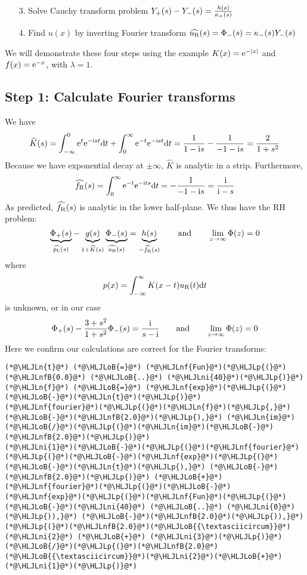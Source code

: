 \documentclass[12pt,landscape]{article}
\newcommand{\HLJLn}[1]{#1}
\newcommand{\HLJLnf}[1]{\textcolor[RGB]{66,102,213}{#1}}
\newcommand{\HLJLnfB}[1]{\textcolor[RGB]{59,151,46}{#1}}
\newcommand{\HLJLni}[1]{\textcolor[RGB]{59,151,46}{#1}}
\newcommand{\HLJLoB}[1]{\textcolor[RGB]{102,102,102}{\textbf{#1}}}
\newcommand{\HLJLp}[1]{#1}
\def\qqand{\qquad\hbox{and}\qquad}
\def\D{ {\rm d} }
\def\I{ {\rm i} }
\def\E{ {\rm e} }
\def\fR{ f_{\rm R} }
\def\dt{\D t}
\begin{document}
{\begin{itemize}
\item[3. ] Solve Cauchy transform problem $Y_+(s) - Y_-(s) = {h(s) \over \kappa_+(s)}$


\item[4. ] Find $u(x)$ by inverting Fourier transform $\widehat{u_{\rm R}}(s) = \Phi_-(s) = \kappa_-(s) Y_-(s)$

\end{itemize}
We will demonstrate these four steps using the example $K(x) = \E^{-|x|}$ and $f(x) = \E^{-x}$, with $\lambda = 1$.
\newpage
\subsection{Step 1: Calculate Fourier transforms}
We have
\[
\widehat{K}(s) = \int_{-\infty}^0 \E^{t}\E^{-\I s t} \dt + \int_0^\infty \E^{-t} \E^{-\I s t} \dt =
 {1 \over 1-\I s} - {1 \over -1-\I s} = {2 \over 1+s^2}
\]
Because we have exponential decay at $\pm \infty$, $\widehat{K}$ is analytic in a strip. Furthermore,
\[
\widehat{f_{\rm R}}(s) = \int_0^\infty \E^{-t} \E^{-\I t s} \dt = -{1 \over -1-\I s} = {\I \over \I-s}
\]
As predicted, $\widehat{\fR}(s)$ is analytic in the lower half-plane. We thus have the RH problem:
\[
\underbrace{\Phi_+(s)}_{\widehat{p_{\rm L}}(s)} - \underbrace{g(s)}_{1 + \widehat K(s)}
\underbrace{\Phi_-(s)}_{\widehat{u_{\rm R}}(s)} = \underbrace{h(s)}_{-\widehat{\fR}(s)} \qqand \lim_{z \to \infty}\Phi(z) = 0
\]
where
\[
p(x) = \int_{-\infty}^\infty K(x-t)u_{\rm R}(t) \dt
\]
is unknown, or in our case
\[
\Phi_+(s) - {3 + s^2 \over 1 + s^2} \Phi_-(s) = {\I \over s - \I} \qqand \lim_{z \to \infty}\Phi(z) = 0
\]
Here we confirm our calculations are correct for the Fourier transforms:


\begin{lstlisting}
(*@\HLJLn{t}@*) (*@\HLJLoB{=}@*) (*@\HLJLnf{Fun}@*)(*@\HLJLp{(}@*)(*@\HLJLnfB{0.0}@*) (*@\HLJLoB{..}@*) (*@\HLJLni{40}@*)(*@\HLJLp{)}@*)
(*@\HLJLn{f}@*) (*@\HLJLoB{=}@*) (*@\HLJLnf{exp}@*)(*@\HLJLp{(}@*)(*@\HLJLoB{-}@*)(*@\HLJLn{t}@*)(*@\HLJLp{)}@*)
(*@\HLJLnf{fourier}@*)(*@\HLJLp{(}@*)(*@\HLJLn{f}@*)(*@\HLJLp{,}@*) (*@\HLJLoB{-}@*)(*@\HLJLnfB{2.0}@*)(*@\HLJLp{),}@*) (*@\HLJLn{im}@*)(*@\HLJLoB{/}@*)(*@\HLJLp{(}@*)(*@\HLJLn{im}@*)(*@\HLJLoB{-}@*)(*@\HLJLnfB{2.0}@*)(*@\HLJLp{)}@*)
(*@\HLJLni{1}@*)(*@\HLJLoB{-}@*)(*@\HLJLp{(}@*)(*@\HLJLnf{fourier}@*)(*@\HLJLp{(}@*)(*@\HLJLoB{-}@*)(*@\HLJLnf{exp}@*)(*@\HLJLp{(}@*)(*@\HLJLoB{-}@*)(*@\HLJLn{t}@*)(*@\HLJLp{),}@*) (*@\HLJLoB{-}@*)(*@\HLJLnfB{2.0}@*)(*@\HLJLp{)}@*) (*@\HLJLoB{+}@*) (*@\HLJLnf{fourier}@*)(*@\HLJLp{(}@*)(*@\HLJLoB{-}@*)(*@\HLJLnf{exp}@*)(*@\HLJLp{(}@*)(*@\HLJLnf{Fun}@*)(*@\HLJLp{(}@*)(*@\HLJLoB{-}@*)(*@\HLJLni{40}@*) (*@\HLJLoB{..}@*) (*@\HLJLni{0}@*)(*@\HLJLp{)),}@*) (*@\HLJLoB{-}@*)(*@\HLJLnfB{2.0}@*)(*@\HLJLp{)),}@*) (*@\HLJLp{(}@*)(*@\HLJLnfB{2.0}@*)(*@\HLJLoB{{\textasciicircum}}@*)(*@\HLJLni{2}@*) (*@\HLJLoB{+}@*) (*@\HLJLni{3}@*)(*@\HLJLp{)}@*)(*@\HLJLoB{/}@*)(*@\HLJLp{(}@*)(*@\HLJLnfB{2.0}@*)(*@\HLJLoB{{\textasciicircum}}@*)(*@\HLJLni{2}@*)(*@\HLJLoB{+}@*)(*@\HLJLni{1}@*)(*@\HLJLp{)}@*)
\end{lstlisting}

}
\end{document}
